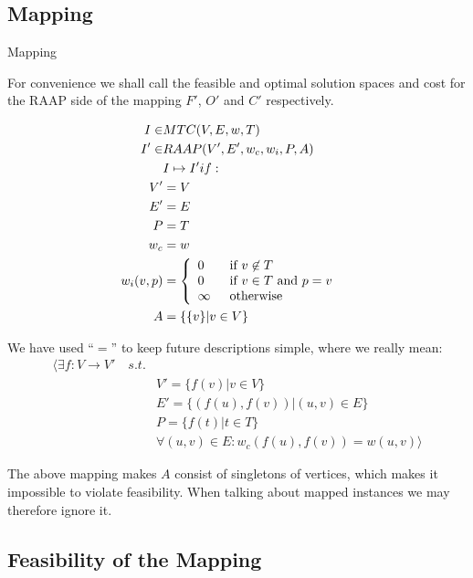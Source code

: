\subsection{Mapping}

\begin{definition}
Mapping

For convenience we shall call the feasible and optimal solution spaces and cost for the RAAP side of the mapping $F'$, $O'$ and $C'$ respectively.

\begin{align}
	\nonumber I \in & MTC(V,E,w,T) &\\
	\nonumber I' \in & RAAP(V', E', w_c, w_i, P, A) &\\
	\nonumber & I \mapsto I' if: &\\
	\nonumber V' & = V\\
	\nonumber E' & = E\\
	\nonumber P & = T\\
	\nonumber w_c & = w\\
	\nonumber w_i(v,p) & = \mbox{$\left\{ 
		\begin{array}{l l}
			0 \quad & \mbox{if $v \not\in T$}\\
			0 & \mbox{if $v \in T$ and $p = v$}\\
			\infty & \mbox{otherwise}\\ \end{array} \right.$} \\
	\nonumber A & = \{\{v\} | v \in V\}
\end{align}

We have used ``$=$'' to keep future descriptions simple, where we really mean:
\begin{align}
	\nonumber \langle \exists f : V \rightarrow V' \quad s.t. & \\
	\nonumber & V' = \{f(v) | v \in V\} \\
	\nonumber & E' = \{(f(u), f(v)) | (u,v) \in E\} \\
	\nonumber & P = \{f(t) | t \in T\} \\
	\nonumber & \forall (u, v) \in E : w_c(f(u), f(v)) = w(u, v) \rangle
\end{align}

The above mapping makes $A$ consist of singletons of vertices, which makes it impossible to violate feasibility.
When talking about mapped instances we may therefore ignore it.
\end{definition}

\subsection{Feasibility of the Mapping}

